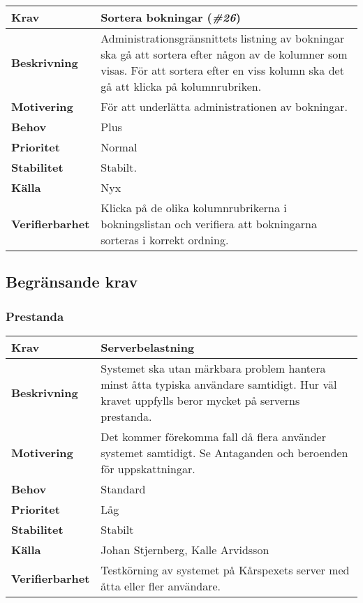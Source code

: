 \documentclass[a4paper, twoside, 11pt, titlepage]{article}
\begin{document}
		\begin{tabular} { p{2.6cm} p{12.5cm} }
			\hline
			\sffamily\textbf{Krav} & Sortera bokningar (\emph{\#26})  \\
			\hline
			\sffamily\textbf{Beskrivning} & Administrationsgränsnittets listning av bokningar ska gå att sortera efter någon av de kolumner som visas. För att sortera efter en viss kolumn ska det gå att klicka på kolumnrubriken.  \\
			\hline
			\sffamily\textbf{Motivering} & För att underlätta administrationen av bokningar.  \\
			\hline
			\sffamily\textbf{Behov} & Plus  \\
			\hline
			\sffamily\textbf{Prioritet} & Normal  \\
			\hline
			\sffamily\textbf{Stabilitet} & Stabilt.  \\
			\hline
			\sffamily\textbf{Källa} & Nyx  \\
			\hline
			\sffamily\textbf{Verifierbarhet} & Klicka på de olika kolumnrubrikerna i bokningslistan och verifiera att bokningarna sorteras i korrekt ordning.  \\
			\hline
		\end{tabular}


	\subsection{Begränsande krav}



		\subsubsection{Prestanda}


		\begin{tabular} { p{2.6cm} p{12.5cm} }
			\hline
			\sffamily\textbf{Krav} & Serverbelastning  \\
			\hline
			\sffamily\textbf{Beskrivning} & Systemet ska utan märkbara problem hantera minst åtta typiska användare samtidigt. Hur väl kravet uppfylls beror mycket på serverns prestanda.  \\
			\hline
			\sffamily\textbf{Motivering} & Det kommer förekomma fall då flera använder systemet samtidigt. Se Antaganden och beroenden för uppskattningar.  \\
			\hline
			\sffamily\textbf{Behov} & Standard  \\
			\hline
			\sffamily\textbf{Prioritet} & Låg  \\
			\hline
			\sffamily\textbf{Stabilitet} & Stabilt  \\
			\hline
			\sffamily\textbf{Källa} & Johan Stjernberg, Kalle Arvidsson  \\
			\hline
			\sffamily\textbf{Verifierbarhet} & Testkörning av systemet på Kårspexets server med åtta eller fler användare.  \\
			\hline
		\end{tabular}
		\vspace{6mm}
\end{document}
